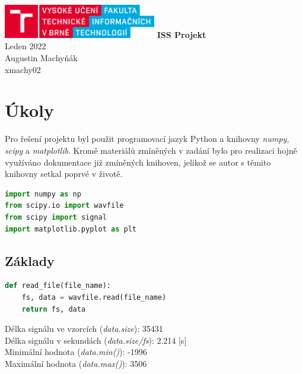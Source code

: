 \documentclass{article}
\begin{document}
\begin{titlepage}
    \centering
    \vfill
    \includegraphics[width=0.5\textwidth]{../doc/fit_logo}
    \vfill
    {\Huge{\bfseries{ISS Projekt}}\\
        \Large{Leden 2022}\\
        \vfill
        Augustin Machyňák \\
        xmachy02
    }
    \vfill
\end{titlepage}

\newpage


\section{Úkoly}
Pro řešení projektu byl použit programovací jazyk Python a knihovny
\textit{numpy}, \textit{scipy} a \textit{matplotlib}. 
Kromě materiálů zmíněných v zadání bylo pro realizaci hojně využíváno dokumentace 
již zmíněných knihoven, jelikož se autor s těmito knihovny setkal poprvé v životě.

\begin{lstlisting}[language=Python, caption={Použité knihovny}]
import numpy as np
from scipy.io import wavfile
from scipy import signal
import matplotlib.pyplot as plt
\end{lstlisting}


\subsection{Základy}

\begin{lstlisting}[language=Python, caption={Načtení vstupního signálu}]
def read_file(file_name):
    fs, data = wavfile.read(file_name)
    return fs, data
\end{lstlisting}

\begin{center}
Délka signálu ve vzorcích (\textit{data.size}): 35431 \\
Délka signálu v sekundách (\textit{data.size/fs}): 2.214 [s]\\
Minimální hodnota (\textit{data.min()}): -1996\\
Maximální hodnota (\textit{data.max()}): 3506\\
\end{center}
\end{document}
